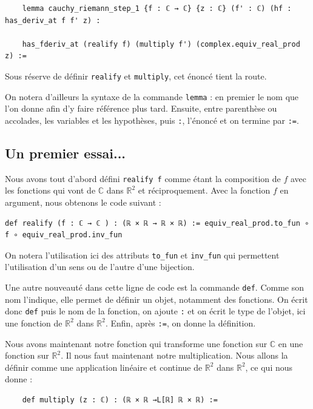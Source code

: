 \documentclass[a4paper, 11pt, twoside]{report}
\newcommand\R{\mathbb{R}}
\newcommand\C{\mathbb{C}}
\begin{document}
\begin{lstlisting}
	lemma cauchy_riemann_step_1 {f : ℂ → ℂ} {z : ℂ} (f' : ℂ) (hf : has_deriv_at f f' z) : 
	
	has_fderiv_at (realify f) (multiply f') (complex.equiv_real_prod z) :=	 
\end{lstlisting}
	
	Sous réserve de définir \verb|realify| et \verb|multiply|, cet énoncé tient la route.
	
	On notera d'ailleurs la syntaxe de la commande \verb|lemma| : en premier le nom que l'on donne afin d'y faire référence plus tard. Ensuite, entre parenthèse ou accolades, les variables et les hypothèses, puis \verb|:|, l'énoncé et on termine par \verb|:=|.
	
	\subsection{Un premier essai...}
	
Nous avons tout d'abord défini \verb|realify f| comme étant la composition de $f$ avec les fonctions qui vont de $\C$ dans $\R^2$ et réciproquement. Avec la fonction $f$ en argument, nous obtenons le code suivant :

\begin{lstlisting}
def realify (f : ℂ → ℂ ) : (ℝ × ℝ → ℝ × ℝ) := equiv_real_prod.to_fun ∘ f ∘ equiv_real_prod.inv_fun
\end{lstlisting}
	
On notera l'utilisation ici des attributs \verb|to_fun| et \verb|inv_fun| qui permettent l'utilisation d'un sens ou de l'autre d'une bijection.

Une autre nouveauté dans cette ligne de code est la commande \verb|def|. Comme son nom l'indique, elle permet de définir un objet, notamment des fonctions. On écrit donc \verb|def| puis le nom de la fonction, on ajoute \verb|:| et on écrit le type de l'objet, ici une fonction de $\R^2$ dans $\R^2$. Enfin, après \verb|:=|, on donne la définition.

\medskip

Nous avons maintenant notre fonction qui transforme une fonction sur $\C$ en une fonction sur $\R^2$. Il nous faut maintenant notre multiplication. Nous allons la définir comme une application linéaire et continue de $\R^2$ dans $\R^2$, ce qui nous donne :

\begin{lstlisting}
	def multiply (z : ℂ) : (ℝ × ℝ →L[ℝ] ℝ × ℝ) := 
\end{lstlisting}
\end{document}
